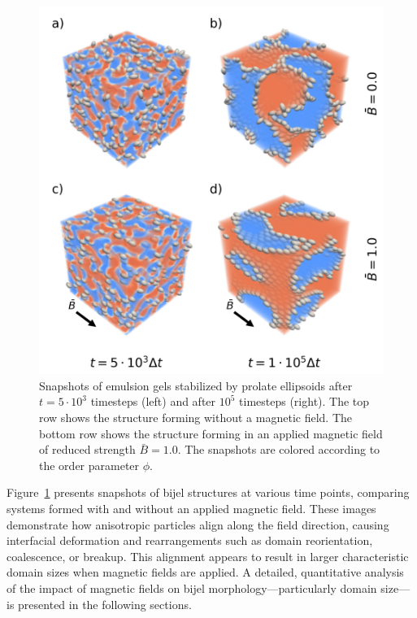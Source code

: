 \begin{figure}
    \centering
    \includegraphics[width=\columnwidth]{../figures/results/paper1/microstructure_viz.png}
    \caption{Snapshots of emulsion gels stabilized by prolate ellipsoids after $t=5\cdot10^3$ timesteps (left) and after $10^5$ timesteps (right). 
             The top row shows the structure forming without a magnetic field. The bottom row shows the structure forming in an applied magnetic 
             field of reduced strength $\bar{B}=1.0$. The snapshots are colored according to the order parameter $\phi$.}
    \label{fig:microstructure_viz}
\end{figure}

Figure~\ref{fig:microstructure_viz} presents snapshots of bijel structures at various time points, comparing systems formed with and without an applied 
magnetic field. These images demonstrate how anisotropic particles align along the field direction, causing interfacial deformation and rearrangements 
such as domain reorientation, coalescence, or breakup. This alignment appears to result in larger characteristic domain sizes when magnetic fields are 
applied. A detailed, quantitative analysis of the impact of magnetic fields on bijel morphology—particularly domain size—is presented in the following sections.
    
